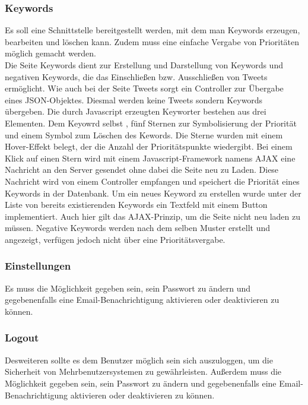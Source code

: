 \subsubsection*{Keywords}
Es soll eine Schnittstelle bereitgestellt werden, mit dem man Keywords erzeugen, bearbeiten und 
löschen kann. Zudem muss eine einfache Vergabe von Prioritäten möglich gemacht werden.\\
Die Seite Keywords dient zur Erstellung und Darstellung von Keywords und negativen Keywords, die das Einschließen bzw. Ausschließen von Tweets ermöglicht. Wie auch bei der Seite Tweets 
sorgt ein Controller zur Übergabe eines JSON-Objektes. Diesmal werden keine Tweets sondern Keywords 
übergeben. Die durch Javascript erzeugten Keyworter bestehen aus drei Elementen. Dem Keyowrd selbst , 
fünf Sternen zur Symbolisierung  der Priorität und einem Symbol zum Löschen des Kewords. Die Sterne 
wurden mit einem Hover-Effekt belegt, der die Anzahl der Prioritätspunkte wiedergibt. Bei einem Klick 
auf einen Stern wird mit einem Javascript-Framework namens AJAX eine Nachricht an den Server gesendet 
ohne dabei die Seite neu zu Laden. Diese Nachricht wird von einem Controller empfangen und speichert 
die Priorität eines Keywords in der Datenbank. Um ein neues Keyword zu erstellen wurde unter der Liste 
von bereits existierenden Keywords ein Textfeld mit einem Button implementiert. Auch hier gilt das 
AJAX-Prinzip, um die Seite nicht neu laden zu müssen. Negative Keywords werden nach dem selben Muster erstellt und angezeigt, verfügen jedoch nicht über eine Prioritätsvergabe.

\subsubsection*{Einstellungen}
Es  muss die Möglichkeit gegeben sein, sein Passwort zu ändern und gegebenenfalls eine Email-Benachrichtigung aktivieren oder deaktivieren zu können. \\

\subsubsection*{Logout}
Desweiteren sollte es dem Benutzer möglich sein sich auszuloggen, um die Sicherheit von 
Mehrbenutzersystemen zu gewährleisten. Außerdem muss die Möglichkeit gegeben sein, sein Passwort zu 
ändern und gegebenenfalls eine Email-Benachrichtigung aktivieren oder deaktivieren zu können.

